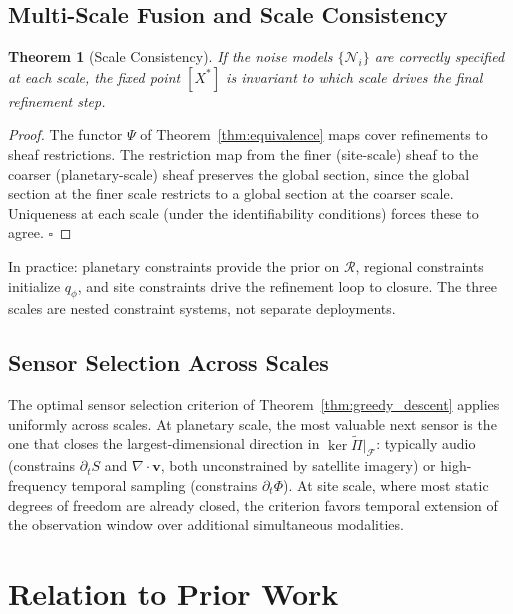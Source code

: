 \documentclass[12pt, oneside]{article}
\newtheorem{theorem}{Theorem}[section]
\newcommand{\Ftil}{\widetilde{\Pi}}
\begin{document}
\subsection{Multi-Scale Fusion and Scale Consistency}

\begin{theorem}[Scale Consistency]
\label{thm:scale}
If the noise models $\{\mathcal{N}_i\}$ are correctly specified at each scale, the fixed
point $[X^*]$ is invariant to which scale drives the final refinement step.
\end{theorem}
\begin{proof}
The functor $\Psi$ of Theorem~\ref{thm:equivalence} maps cover refinements to sheaf
restrictions. The restriction map from the finer (site-scale) sheaf to the coarser
(planetary-scale) sheaf preserves the global section, since the global section at the
finer scale restricts to a global section at the coarser scale. Uniqueness at each scale
(under the identifiability conditions) forces these to agree. $\square$
\end{proof}

In practice: planetary constraints provide the prior on $\mathcal{R}$, regional
constraints initialize $q_\phi$, and site constraints drive the refinement loop to
closure. The three scales are nested constraint systems, not separate deployments.

\subsection{Sensor Selection Across Scales}

The optimal sensor selection criterion of Theorem~\ref{thm:greedy_descent} applies
uniformly across scales. At planetary scale, the most valuable next sensor is the one
that closes the largest-dimensional direction in $\ker \Ftil|_{\mathcal{F}}$: typically
audio (constrains $\partial_t S$ and $\nabla\cdot\mathbf{v}$, both unconstrained by
satellite imagery) or high-frequency temporal sampling (constrains $\partial_t\Phi$).
At site scale, where most static degrees of freedom are already closed, the criterion
favors temporal extension of the observation window over additional simultaneous modalities.

\section{Relation to Prior Work}
\label{sec:related}
\end{document}

